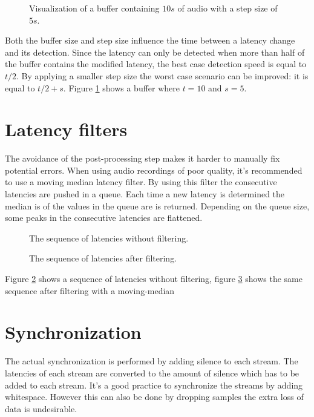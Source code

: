\documentclass[twocolumn]{phdsymp} %
\begin{document}
\begin{figure}[ht]
	\begin{center}
		
		\caption{\label{buffers}Visualization of a buffer containing $10s$ of audio with a step size of $5s$.}
	\end{center}
\end{figure}

Both the buffer size and step size influence the time between a latency change and its detection. Since the latency can only be detected when more than half of the buffer contains the modified latency, the best case detection speed is equal to $ t/2 $. By applying a smaller step size the worst case scenario can be improved: it is equal to $ t/2 + s $. Figure \ref{buffers} shows a buffer where $t=10$ and $s=5$.


\section{Latency filters}
The avoidance of the post-processing step makes it harder to manually fix potential errors. When using audio recordings of poor quality, it's recommended to use a moving median latency filter. By using this filter the consecutive latencies are pushed in a queue. Each time a new latency is determined the median is of the values in the queue are is returned. Depending on the queue size, some peaks in the consecutive latencies are flattened. 

\begin{figure}[th!]
	\begin{center}
		\caption{\label{latency_nofilter}The sequence of latencies without filtering.}
	\end{center}
\end{figure}

\begin{figure}[th!]
	\begin{center}
		\caption{\label{latency_filter}The sequence of latencies after filtering.}
	\end{center}
\end{figure}

Figure \ref{latency_nofilter} shows a sequence of latencies without filtering, figure \ref{latency_filter} shows the same sequence after filtering with a moving-median 
 
\section{Synchronization}
The actual synchronization is performed by adding silence to each stream. The latencies of each stream are converted to the amount of silence which has to be added to each stream. It's a good practice to synchronize the streams by adding whitespace. However this can also be done by dropping samples the extra loss of data is undesirable.
\end{document}
